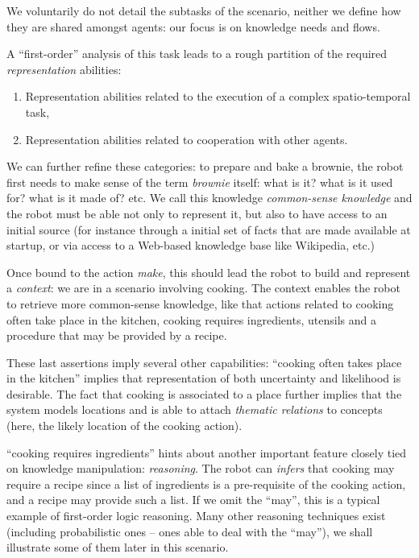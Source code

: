 We voluntarily do not detail the subtasks of the scenario, neither we define
how they are shared amongst agents: our focus is on knowledge needs and flows.

A ``first-order'' analysis of this task leads to a rough partition of the
required \emph{representation} abilities:

\begin{enumerate}

	\item Representation abilities related to the execution of a complex
	spatio-temporal task,

	\item Representation abilities related to cooperation with other agents.

\end{enumerate}

We can further refine these categories: to prepare and bake a brownie, the
robot first needs to make sense of the term \emph{brownie} itself: what is it?
what is it used for? what is it made of? etc. We call this knowledge
\emph{common-sense knowledge} and the robot must be able not only to represent
it, but also to have access to an initial source (for instance through a
initial set of facts that are made available at startup, or via access to a
Web-based knowledge base like Wikipedia, etc.)

Once bound to the action \emph{make}, this should lead the robot to build and
represent a \emph{context}: we are in a scenario involving cooking. The context
enables the robot to retrieve more common-sense knowledge, like that actions
related to cooking often take place in the kitchen, cooking requires
ingredients, utensils and a procedure that may be provided by a recipe.

These last assertions imply several other capabilities: ``cooking often takes
place in the kitchen'' implies that representation of both uncertainty and
likelihood is desirable. The fact that cooking is associated to a place further
implies that the system models locations and is able to attach \emph{thematic
relations} to concepts (here, the likely location of the cooking action).

``cooking requires ingredients'' hints about another important feature closely
tied on knowledge manipulation: \emph{reasoning}. The robot can \emph{infers}
that cooking may require a recipe since a list of ingredients is a
pre-requisite of the cooking action, and a recipe may provide such a list.  If
we omit the ``may'', this is a typical example of first-order logic reasoning.
Many other reasoning techniques exist (including probabilistic ones -- ones
able to deal with the ``may''), we shall illustrate some of them later in this
scenario.

